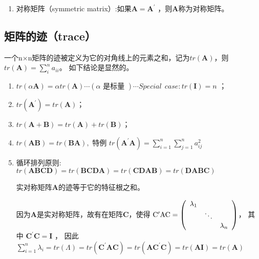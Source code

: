 \begin{enumerate}[ 1) ]
	\item 对称矩阵（symmetric matrix）:如果$ \boldsymbol{A} =  \boldsymbol{A}^{\prime} $ ，则$ \boldsymbol{A} $称为对称矩阵。
\end{enumerate}

\subsection{矩阵的迹（trace）}

一个n×n矩阵的迹被定义为它的对角线上的元素之和，记为$ tr(\boldsymbol{A}) $，则 $  tr(\boldsymbol{A}) = \sum_{i}^{n} a_{ii} $。
如下结论是显然的。

\begin{enumerate}[ 1) ]
	\item  $ {tr}(\alpha \boldsymbol{A}) = \alpha {tr}(\boldsymbol{A}) \cdots(\alpha \text { 是标量 }) \cdots  
	    Special \ \ case:  {tr}(\boldsymbol{I}) = n $  ；
	\item  $ {tr}\left( \boldsymbol{A} ^{\prime}\right) = {tr}(\boldsymbol{A}) $；
	\item  $ {tr}(\boldsymbol{ A + B }) = {tr}( \boldsymbol{A} )+{tr}( \boldsymbol{B} ) $；
	\item  $ {tr}(\boldsymbol{A B }) = {tr}(\boldsymbol{B A}), $ \qquad  
				特例  $ {tr}\left(\boldsymbol{A}^{\prime} \boldsymbol{A} \right) = \sum_{i = 1}^{n} \sum_{j = 1}^{n} a_{i j}^{2} $
	\item  循环排列原则: \quad $ tr(\boldsymbol{ABCD}) = tr(\boldsymbol{BCDA}) = tr(\boldsymbol{CDAB}) =tr(\boldsymbol{DABC}) $
	
	\begin{theorem}
		实对称矩阵$ \boldsymbol{A} $的迹等于它的特征根之和。
	\end{theorem}
	
	因为$ \boldsymbol{A} $是实对称矩阵，故有在矩阵$ \boldsymbol{C} $，使得 
	$  \rm \boldsymbol{C}^{\prime} \boldsymbol{A}  \boldsymbol{C}  = 
	\left(\begin{array}{ccc}
		\lambda_{1} 	&  		  		& \\
		&      			\ddots    		&\\
		&  				&     			\lambda_{n}
	\end{array} \right) $，
	其中 $ \boldsymbol{C}^{\prime}  \boldsymbol{C} = \boldsymbol{I} $ ，
	因此 $ \sum_{i=1}^{n} \lambda_{i}={tr}(\Lambda)
		={tr}\left(\boldsymbol{C}^{\prime} \boldsymbol{A} \boldsymbol{C}\right)
	    = {tr}\left(\boldsymbol{A} \boldsymbol{C}^{\prime} \boldsymbol{C}\right)={tr}(\boldsymbol{AI} )={tr}(\boldsymbol{A}) $
\end{enumerate}

